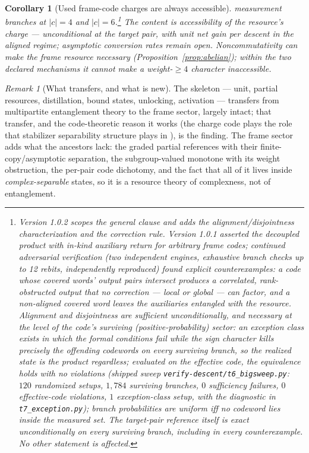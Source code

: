 \documentclass[11pt]{article}
\theoremstyle{plain}
\newtheorem{corollary}[theorem]{Corollary}
\theoremstyle{definition}
\theoremstyle{remark}
\newtheorem{remark}[theorem]{Remark}
\theoremstyle{plain}
\begin{document}
\begin{corollary}[Used frame-code charges are always accessible]
{measurement branches at $|c|=4$ and $|c|=6$.}\footnote{Version
1.0.2 scopes the general clause and adds the
alignment/disjointness characterization and the correction rule.
Version 1.0.1 asserted the decoupled product with in-kind
auxiliary return for arbitrary frame codes; continued adversarial
verification (two independent engines, exhaustive branch checks up
to 12 rebits, independently reproduced) found explicit
counterexamples: a code whose covered words' output pairs
intersect produces a correlated, rank-obstructed output that no
correction --- local or global --- can factor, and a non-aligned
covered word leaves the auxiliaries entangled with the resource.
Alignment and disjointness are sufficient unconditionally, and
necessary at the level of the code's \emph{surviving}
(positive-probability) sector: an exception class exists in which
the formal conditions fail while the sign character kills
precisely the offending codewords on every surviving branch, so
the realized state is the product regardless; evaluated on the
effective code, the equivalence holds with no violations (shipped
sweep \texttt{verify-descent/t6\_bigsweep.py}: $120$ randomized
setups, $1{,}784$ surviving branches, $0$ sufficiency failures,
$0$ effective-code violations, $1$ exception-class setup, with
the diagnostic in \texttt{t7\_exception.py}); branch probabilities
are uniform iff no codeword lies inside the measured set. The
target-pair reference itself is exact unconditionally on every
surviving branch, including in every counterexample.
No other statement is affected.} The content is
\emph{accessibility} of the resource's charge ---
unconditional at the target pair, with unit net gain per descent
in the aligned regime; asymptotic conversion rates remain
open. Noncommutativity can make the
frame resource necessary (Proposition~\ref{prop:abelian}); within
the two declared mechanisms it cannot make a weight-$\ge4$
character inaccessible.
\end{corollary}

\begin{remark}[What transfers, and what is new]
The skeleton --- unit, partial resources, distillation, bound
states, unlocking, activation --- transfers from multipartite
entanglement theory to the frame sector, largely intact; that
transfer, and the code-theoretic reason it works (the charge code
plays the role that stabilizer separability structure plays in
\cite{wangying2007,smolin2001,augusiakhorodecki2006,
durcirac2000}), is the finding. The frame sector adds what the
ancestors lack: the graded partial references with their
finite-copy/asymptotic separation, the subgroup-valued monotone
with its weight obstruction, the per-pair code dichotomy, and the
fact that all of it lives inside \emph{complex-separable} states,
so it is a resource theory of complexness, not of entanglement.
\end{remark}
\end{document}
